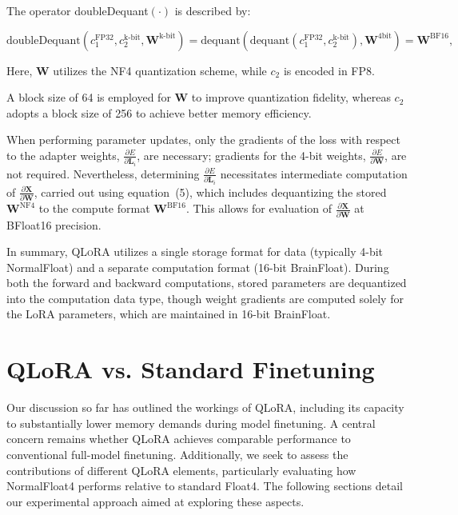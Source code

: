 The operator doubleDequant$(\cdot)$ is described by:

\begin{equation}
    \text{doubleDequant}(c_1^{\text{FP32}}, c_2^{\text{k-bit}}, \mathbf{W}^{\text{k-bit}}) = \text{dequant}(\text{dequant}(c_1^{\text{FP32}}, c_2^{\text{k-bit}}), \mathbf{W}^{\text{4bit}}) = \mathbf{W}^{\text{BF16}},
\end{equation}

Here, $\mathbf{W}$ utilizes the NF4 quantization scheme, while $c_2$ is encoded in FP8.

A block size of 64 is employed for $\mathbf{W}$ to improve quantization fidelity, whereas $c_2$ adopts a block size of 256 to achieve better memory efficiency.

When performing parameter updates, only the gradients of the loss with respect to the adapter weights, $\frac{\partial E}{\partial \mathbf{L}_i}$, are necessary; gradients for the 4-bit weights, $\frac{\partial E}{\partial \mathbf{W}}$, are not required. Nevertheless, determining $\frac{\partial E}{\partial \mathbf{L}_i}$ necessitates intermediate computation of $\frac{\partial \mathbf{X}}{\partial \mathbf{W}}$, carried out using equation~(5), which includes dequantizing the stored $\mathbf{W}^{\text{NF4}}$ to the compute format $\mathbf{W}^{\text{BF16}}$. This allows for evaluation of $\frac{\partial \mathbf{X}}{\partial \mathbf{W}}$ at BFloat16 precision.

In summary, \textsc{QLoRA} utilizes a single storage format for data (typically 4-bit NormalFloat) and a separate computation format (16-bit BrainFloat). During both the forward and backward computations, stored parameters are dequantized into the computation data type, though weight gradients are computed solely for the LoRA parameters, which are maintained in 16-bit BrainFloat.

\section{QLoRA vs. Standard Finetuning}
\label{sec:comp_to_std}

Our discussion so far has outlined the workings of QLoRA, including its capacity to substantially lower memory demands during model finetuning. A central concern remains whether QLoRA achieves comparable performance to conventional full-model finetuning. Additionally, we seek to assess the contributions of different QLoRA elements, particularly evaluating how NormalFloat4 performs relative to standard Float4. The following sections detail our experimental approach aimed at exploring these aspects.


